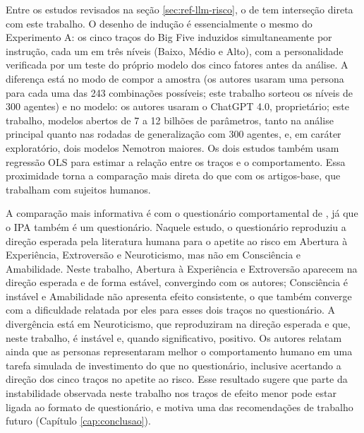 Entre os estudos revisados na seção \ref{sec:ref-llm-risco}, o de
 tem interseção direta com este trabalho. O
desenho de indução é essencialmente o mesmo do Experimento A: os cinco
traços do Big Five induzidos simultaneamente por instrução, cada um em
três níveis (Baixo, Médio e Alto), com a personalidade verificada por um
teste do próprio modelo dos cinco fatores antes da análise. A diferença
está no modo de compor a amostra (os autores usaram uma persona para cada
uma das 243 combinações possíveis; este trabalho sorteou os níveis de 300
agentes) e no modelo: os autores usaram o ChatGPT 4.0, proprietário;
este trabalho, modelos abertos de 7 a 12 bilhões de parâmetros, tanto na
análise principal quanto nas rodadas de generalização com 300 agentes, e,
em caráter exploratório, dois modelos Nemotron maiores. Os dois estudos
também usam regressão OLS para estimar a relação entre os traços e o
comportamento. Essa proximidade torna a comparação mais direta do que com
os artigos-base, que trabalham com sujeitos humanos.

A comparação mais informativa é com o questionário comportamental de
, já que o IPA também é um questionário. Naquele
estudo, o questionário reproduziu a direção esperada pela literatura
humana para o apetite ao risco em Abertura à Experiência, Extroversão e
Neuroticismo, mas não em Consciência e Amabilidade. Neste trabalho,
Abertura à Experiência e Extroversão aparecem na direção esperada e de
forma estável, convergindo com os autores; Consciência é instável e
Amabilidade não apresenta efeito consistente, o que também converge com
a dificuldade relatada por eles para esses dois traços no questionário.
A divergência está em Neuroticismo, que 
reproduziram na direção esperada e que, neste trabalho, é instável e,
quando significativo, positivo. Os autores relatam ainda que as personas
representaram melhor o comportamento humano em uma tarefa simulada de
investimento do que no questionário, inclusive acertando a direção dos
cinco traços no apetite ao risco. Esse resultado sugere que parte da
instabilidade observada neste trabalho nos traços de efeito menor pode
estar ligada ao formato de questionário, e motiva uma das recomendações
de trabalho futuro (Capítulo \ref{cap:conclusao}).

